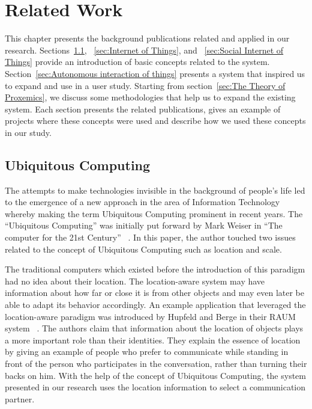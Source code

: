 \chapter{Related Work}
\label{ch:related-work}
This chapter presents the background publications related and applied in our research.
Sections~\ref{sec:Ubiquitous Computing}, ~\ref{sec:Internet of Things}, and ~\ref{sec:Social Internet of Things}
provide an introduction of basic concepts related to the system.
Section~\ref{sec:Autonomous interaction of things} presents a system that inspired us to expand
and use in a user study.
Starting from section~\ref{sec:The Theory of Proxemics}, we discuss some methodologies
that help us to expand the existing system.
Each section presents the related publications, gives an example of projects where these concepts
were used and describe how we used these concepts in our study.

\section{Ubiquitous Computing}
\label{sec:Ubiquitous Computing}
The attempts to make technologies invisible in the background of people’s life led to the emergence
of a new approach in the area of Information Technology whereby making the term
Ubiquitous Computing prominent in recent years.
The “Ubiquitous Computing” was initially put forward by Mark Weiser
in “The computer for the 21st Century” ~\cite{weiser1999computer}.
In this paper, the author touched two issues related to the concept of
Ubiquitous Computing such as location and scale.

The traditional computers which existed before the introduction of this
paradigm had no idea about their location.
The location-aware system may have information about how far or close it is from other
objects and may even later be able to adapt its behavior accordingly.
An example application that leveraged the location-aware paradigm was introduced by
Hupfeld and Berge in their RAUM system ~\cite{hupfeld2000spatially}.
The authors claim that information about the location of objects plays
a more important role than their identities.
They explain the essence of location by giving an example of people who prefer to communicate
while standing in front of the person who participates in the conversation, rather than turning their backs on him.
With the help of the concept of Ubiquitous Computing, the system presented in our
research uses the location information to select a communication partner.

